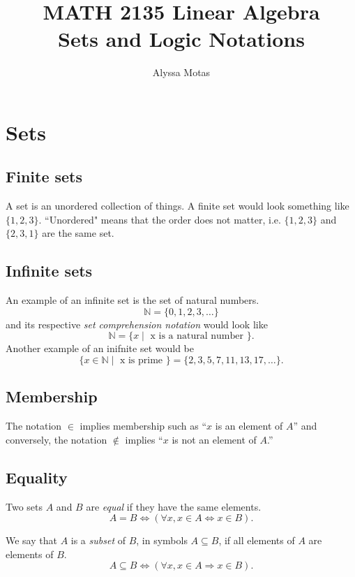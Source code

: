 \documentclass[11pt]{article}
\title{\textbf{MATH 2135 Linear Algebra} \\ Sets and Logic Notations}
\author{Alyssa Motas}
\begin{document}
    \maketitle

    \pagebreak

    \tableofcontents

    \pagebreak

    \section{Sets}

    \subsection{Finite sets}

    A set is an unordered collection of things. A finite set would look something like \(\{1,2,3\}\). ``Unordered" means that the order does not matter, i.e. \(\{1,2,3\}\) and \(\{2,3,1\}\) are the same set. 

    \subsection{Infinite sets}

    An example of an infinite set is the set of natural numbers. \[\mathbb{N} = \{0,1,2,3,\dots\}\] and its respective \emph{set comprehension notation} would look like \[\mathbb{N} = \{ x \mid \text{ x is a natural number }\}.\] Another example of an inifnite set would be \[\{x \in \mathbb{N} \mid \text{ x is prime }\} = \{2,3,5,7,11,13,17, \dots\}.\]

    \subsection{Membership}

    The notation \(\in\) implies membership such as ``$x$ is an element of $A$'' and conversely, the notation \(\notin\) implies ``$x$ is not an element of $A$.''

    \subsection{Equality}

    Two sets $A$ and $B$ are \emph{equal} if they have the same elements. \[A = B \Leftrightarrow (\forall x, x \in A \Leftrightarrow x \in B).\] 

    We say that $A$ is a \emph{subset} of $B$, in symbols \(A \subseteq B\), if all elements of $A$ are elements of $B$. \[A \subseteq B \Leftrightarrow (\forall x, x\in A \Rightarrow x \in B).\]
\end{document}

